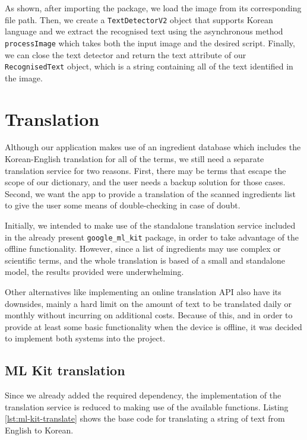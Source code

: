 As shown, after importing the package, we load the image from its corresponding file path. Then, we create a \texttt{TextDetectorV2} object that supports Korean language and we extract the recognised text using the asynchronous method \texttt{processImage} which takes both the input image and the desired script. Finally, we can close the text detector and return the text attribute of our \texttt{RecognisedText} object, which is a string containing all of the text identified in the image.

\section{Translation}

Although our application makes use of an ingredient database which includes the Korean-English translation for all of the terms, we still need a separate translation service for two reasons. First, there may be terms that escape the scope of our dictionary, and the user needs a backup solution for those cases. Second, we want the app to provide a translation of the scanned ingredients list to give the user some means of double-checking in case of doubt.

Initially, we intended to make use of the standalone translation service included in the already present \texttt{google\_ml\_kit} package, in order to take advantage of the offline functionality. However, since a list of ingredients may use complex or scientific terms, and the whole translation is based of a small and standalone model, the results provided were underwhelming.

Other alternatives like implementing an online translation API also have its downsides, mainly a hard limit on the amount of text to be translated daily or monthly without incurring on additional costs. Because of this, and in order to provide at least some basic functionality when the device is offline, it was decided to implement both systems into the project.

\subsection{ML Kit translation}

Since we already added the required dependency, the implementation of the translation service is reduced to making use of the available functions. Listing \ref{lst:ml-kit-translate} shows the base code for translating a string of text from English to Korean. 

